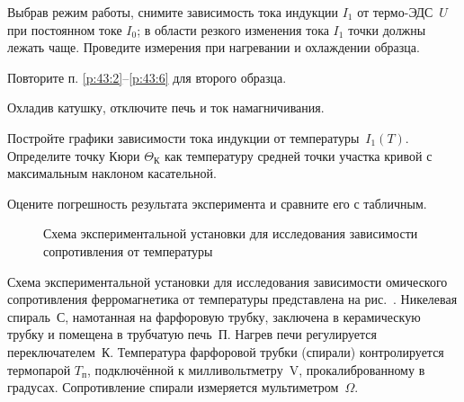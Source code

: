 \begin{lab:task}
\item \label{p:43:6}
  Выбрав режим работы, снимите зависимость тока индукции $I_1$ от термо-ЭДС~$U$
при постоянном токе $I_0$; в области резкого изменения тока $I_1$ точки 
должны лежать чаще. Проведите измерения при нагревании и охлаждении образца.

\item Повторите п. \ref{p:43:2}--\ref{p:43:6} для второго образца.
\item Охладив катушку, отключите печь и ток намагничивания.


\item Постройте графики зависимости тока индукции от температуры~$I_1(T)$. 
Определите точку Кюри $\Theta_{К}$ как температуру средней точки участка
кривой с максимальным наклоном касательной.



\item Оцените погрешность результата эксперимента и сравните его с табличным.

\end{lab:task}


\experiment

\begin{wrapfigure}{o}{0.5\textwidth}
    \centering\small
    \caption{Схема экспериментальной установки для исследования
        зависимости сопротивления от температуры}
\end{wrapfigure}

Схема экспериментальной установки для исследования зависимости омического
сопротивления ферромагнетика от температуры представлена на
рис.~. 
Никелевая спираль~С, намотанная на фарфоровую трубку, 
заключена в керамическую трубку и помещена в трубчатую печь~П. 
Нагрев печи регулируется переключателем~К. Температура фарфоровой трубки 
(спирали) контролируется термопарой $T_{\text{п}}$, подключённой к 
милливольтметру~V, прокалиброванному в градусах. Сопротивление
спирали измеряется мультиметром~$\Omega$.



